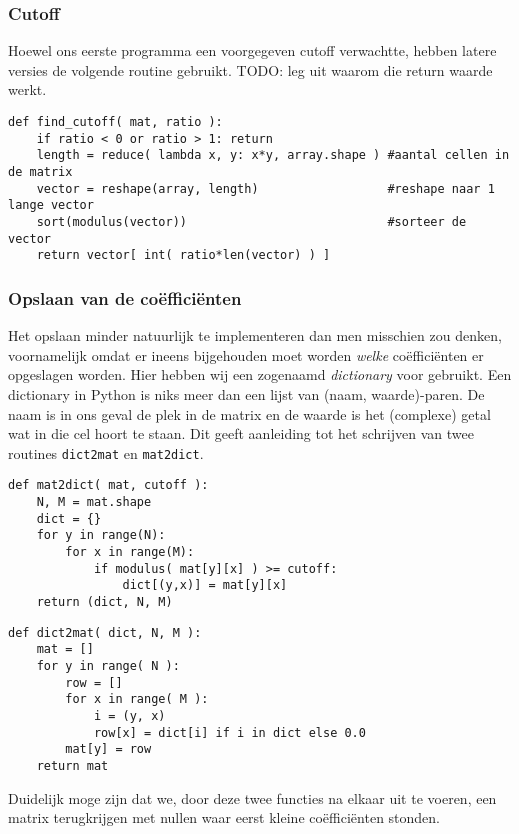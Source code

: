\subsubsection{Cutoff}
Hoewel ons eerste programma een voorgegeven cutoff verwachtte, hebben latere versies de volgende routine gebruikt. TODO: leg uit waarom die return waarde werkt.
\begin{lstlisting}[caption=Het vinden van een goede cutoff-waarde gegeven een gewenst compressieniveau]
def find_cutoff( mat, ratio ):
	if ratio < 0 or ratio > 1: return
	length = reduce( lambda x, y: x*y, array.shape ) #aantal cellen in de matrix 
	vector = reshape(array, length) 				 #reshape naar 1 lange vector
	sort(modulus(vector)) 							 #sorteer de vector
	return vector[ int( ratio*len(vector) ) ]
\end{lstlisting}

\subsubsection{Opslaan van de co\"effici\"enten}
Het opslaan minder natuurlijk te implementeren dan men misschien zou denken, voornamelijk omdat er ineens bijgehouden moet worden \emph{welke} co\"effici\"enten er opgeslagen worden. Hier hebben wij een zogenaamd \emph{dictionary} voor gebruikt. Een dictionary in Python is niks meer dan een lijst van (naam, waarde)-paren. De naam is in ons geval de plek in de matrix en de waarde is het (complexe) getal wat in die cel hoort te staan. Dit geeft aanleiding tot het schrijven van twee routines \texttt{dict2mat} en \texttt{mat2dict}.
\begin{lstlisting}[caption=Matrix naar dictionary conversie]
def mat2dict( mat, cutoff ):
	N, M = mat.shape
	dict = {}
	for y in range(N):
		for x in range(M):
			if modulus( mat[y][x] ) >= cutoff:
				dict[(y,x)] = mat[y][x]
	return (dict, N, M)
\end{lstlisting}

\begin{lstlisting}[caption=Dictionary naar matrix conversie]
def dict2mat( dict, N, M ):
	mat = []
	for y in range( N ):
		row = []
		for x in range( M ):
			i = (y, x)
			row[x] = dict[i] if i in dict else 0.0
		mat[y] = row
	return mat
\end{lstlisting}

Duidelijk moge zijn dat we, door deze twee functies na elkaar uit te voeren, een matrix terugkrijgen met nullen waar eerst kleine co\"effici\"enten stonden.

